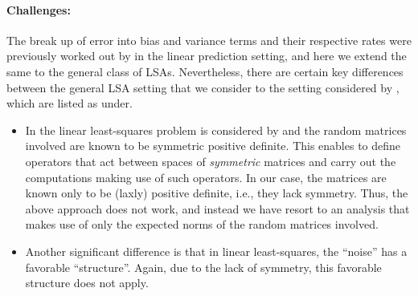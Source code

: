 \paragraph{Challenges:} The break up of error into bias and variance terms and their respective rates were previously worked out by \cite{bach} in the linear prediction setting, and here we extend the same to the general class of LSAs. Nevertheless, there are certain key differences between the general LSA setting that we consider to the setting considered by \cite{bach}, which are listed as under.
\begin{itemize}[leftmargin=*, before = \leavevmode\vspace{-\baselineskip}]
\item In the linear least-squares problem is considered by \citet{bachharder} and the random matrices involved are known to be symmetric positive definite. This enables \citet{bachharder} to define operators that act between spaces of \emph{symmetric} matrices and carry out the computations making use of such operators. In our case, the matrices are known only to be (laxly) positive definite, i.e., they lack symmetry. 
Thus, the above approach does not work, and instead we have resort to an analysis that makes use of only the expected norms of the random matrices involved.
\item Another significant difference is that in linear least-squares, the ``noise'' has a favorable ``structure''. Again, due to the lack of symmetry, this favorable structure does not apply. 
\end{itemize}
